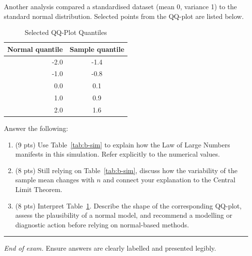 \documentclass[11pt]{article}
\begin{document}
Another analysis compared a standardised dataset (mean 0, variance 1) to the standard normal distribution. Selected points from the QQ-plot are listed below.

\begin{table}[h]
\centering
\caption{Selected QQ-Plot Quantiles}\label{tab:b-qq}
\begin{tabular}{@{}rc@{}}
\toprule
\textbf{Normal quantile} & \textbf{Sample quantile}\\
\midrule
-2.0 & -1.4 \\
-1.0 & -0.8 \\
 0.0 &  0.1 \\
 1.0 &  0.9 \\
 2.0 &  1.6 \\
\bottomrule
\end{tabular}
\end{table}

\medskip
Answer the following:
\begin{enumerate}
  \item (9 pts) Use Table~\ref{tab:b-sim} to explain how the Law of Large Numbers manifests in this simulation. Refer explicitly to the numerical values.
  \item (8 pts) Still relying on Table~\ref{tab:b-sim}, discuss how the variability of the sample mean changes with $n$ and connect your explanation to the Central Limit Theorem.
  \item (8 pts) Interpret Table~\ref{tab:b-qq}. Describe the shape of the corresponding QQ-plot, assess the plausibility of a normal model, and recommend a modelling or diagnostic action before relying on normal-based methods.
\end{enumerate}

\vspace{0.75em}
\hrule
\vspace{0.25em}

\noindent\textit{End of exam.} Ensure answers are clearly labelled and presented legibly.
\end{document}
